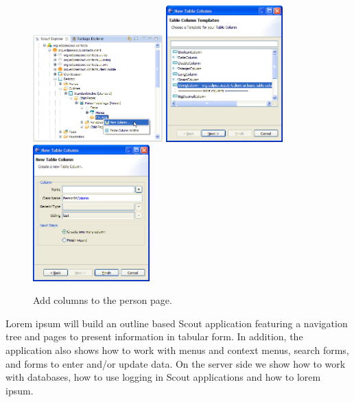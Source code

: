 \documentclass[a4paper,10pt,twoside]{book}
\begin{document}
\begin{figure}
\includegraphics[width=5cm]{new_column_personid_contextmenu.png} \hspace{2mm}
\includegraphics[width=4.5cm]{new_column_personid_1.png} \hspace{2mm}
\includegraphics[width=4.5cm]{new_column_personid_2.png}
\caption{Add columns to the person page. }
\end{figure}

Lorem ipsum will build an outline based Scout application featuring a navigation tree and pages to present information in tabular form. 
In addition, the application also shows how to work with menus and context menus, search forms, and forms to enter and/or update data. 
On the server side we show how to work with databases, how to use logging in Scout applications and how to lorem ipsum. 
\end{document}
